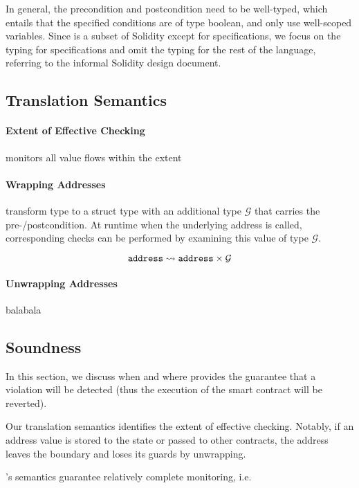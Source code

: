 In general, the precondition and postcondition need to be well-typed, which
entails that the specified conditions are of type boolean, and only
use well-scoped variables.
Since \corelang is a subset of Solidity except for specifications, we focus on
the typing for specifications and omit the typing for the rest of the language,
referring to the informal Solidity design document.


\subsection{Translation Semantics}


\paragraph{Extent of Effective Checking}
monitors all value flows within the extent

\paragraph{Wrapping Addresses} \lang transform  type to a struct
type with an additional type $\mathcal{G}$ that carries the pre-/postcondition.
At runtime when the underlying address is called,
corresponding checks can be performed by examining this value of type $\mathcal{G}$.

$$
\texttt{address} \leadsto \texttt{address} \times \mathcal{G}
$$

\paragraph{Unwrapping Addresses} balabala

\subsection{Soundness}

In this section, we discuss when and where \corelang provides the guarantee
that a violation will be detected (thus the execution of the smart contract
will be reverted).

Our translation semantics identifies the extent of effective checking.
Notably, if an address value is stored to the state or passed to other
contracts, the address leaves the boundary and loses its guards by unwrapping.


\corelang's semantics guarantee relatively complete monitoring, i.e.


